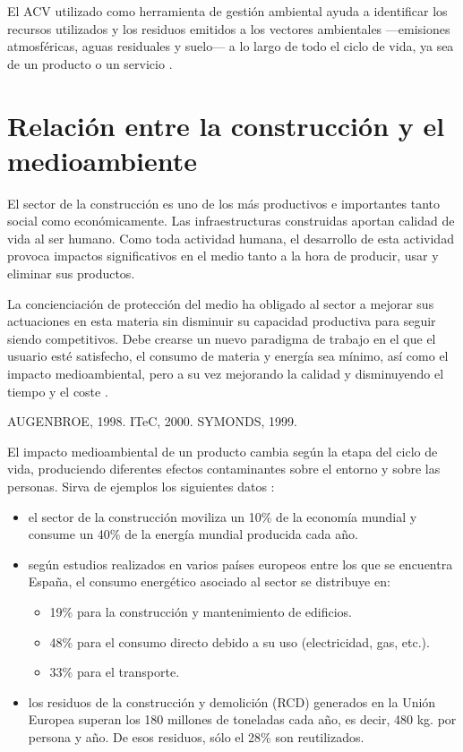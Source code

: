 El ACV utilizado como herramienta de gestión ambiental ayuda a identificar los recursos utilizados y los residuos emitidos a los vectores ambientales —emisiones atmosféricas, aguas residuales y suelo— a lo largo de todo el ciclo de vida, ya sea de un producto o un servicio \cite{iso14440}.

\section{Relación entre la construcción y el medioambiente}
El sector de la construcción es uno de los más productivos e importantes tanto social como económicamente. Las infraestructuras construidas aportan calidad de vida al ser humano. Como toda actividad humana, el desarrollo de esta actividad provoca impactos significativos en el medio tanto a la hora de producir, usar y eliminar sus productos.

La concienciación de protección del medio ha obligado al sector a mejorar sus actuaciones en esta materia sin disminuir su capacidad productiva para seguir siendo competitivos. Debe crearse un nuevo paradigma de trabajo en el que el usuario esté satisfecho, el consumo de materia y energía sea mínimo, así como el impacto medioambiental, pero a su vez mejorando la calidad y disminuyendo el tiempo y el coste \cite{carvalho}.

AUGENBROE, 1998.
ITeC, 2000.
SYMONDS, 1999.

El impacto medioambiental de un producto cambia según la etapa del ciclo de vida, produciendo diferentes efectos contaminantes sobre el entorno y sobre las personas. Sirva de ejemplos los siguientes datos \cite{carvalho}:
\begin{itemize}
\item el sector de la construcción moviliza un 10\% de la economía mundial y consume un 40\% de la energía mundial producida cada año.
\item según estudios realizados en varios países europeos entre los que se encuentra España, el consumo energético asociado al sector se distribuye en:
  \begin{itemize}
  \item 19\% para la construcción y mantenimiento de edificios.
  \item 48\% para el consumo directo debido a su uso (electricidad, gas, etc.).
  \item 33\% para el transporte.
  \end{itemize}
\item los residuos de la construcción y demolición (RCD) generados en la Unión Europea superan los 180 millones de toneladas cada año, es decir, 480 kg. por persona y año. De esos residuos, sólo el 28\% son reutilizados.
\end{itemize}

